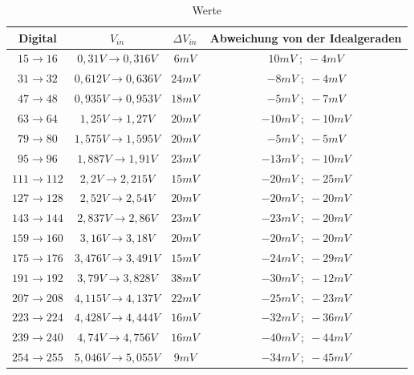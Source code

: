 \documentclass[12pt, a4paper, ngerman]{article}
\begin{document}
\begin{table}%
  \centering
  \begin{tabular}{|c|c|c|c|}
    \hline
    Digital              & $V_{in}$                   & $\Delta V_{in}$ & Abweichung von der Idealgeraden \\\hline
    $15\rightarrow 16$   & $0,31V\rightarrow 0,316V$  & $6mV$           & $10mV\;;\;-4mV$                 \\\hline
    $31\rightarrow 32$   & $0,612V\rightarrow 0,636V$ & $24mV$          & $-8mV\;;\; -4mV$                \\\hline
    $47\rightarrow 48$   & $0,935V\rightarrow 0,953V$ & $18mV$          & $-5mV\;;\; -7mV$                \\\hline
    $63\rightarrow 64$   & $1,25V\rightarrow 1,27 V$  & $20mV$          & $-10mV\;;\;-10mV$               \\\hline
    $79\rightarrow 80$   & $1,575V\rightarrow 1,595V$ & $20mV$          & $-5mV\;;\; -5mV$                \\\hline
    $95\rightarrow 96$   & $1,887V\rightarrow 1,91 V$ & $23mV$          & $-13mV\;;\;-10mV$               \\\hline
    $111\rightarrow 112$ & $2,2V\rightarrow 2,215V$   & $15mV$          & $-20mV\;;\;-25mV$               \\\hline
    $127\rightarrow 128$ & $2,52V\rightarrow 2,54 V$  & $20mV$          & $-20mV\;;\;-20mV$               \\\hline
    $143\rightarrow 144$ & $2,837V\rightarrow 2,86 V$ & $23mV$          & $-23mV\;;\;-20mV$               \\\hline
    $159\rightarrow 160$ & $3,16V\rightarrow 3,18 V$  & $20mV$          & $-20mV\;;\;-20mV$               \\\hline
    $175\rightarrow 176$ & $3,476V\rightarrow 3,491V$ & $15mV$          & $-24mV\;;\;-29mV$               \\\hline
    $191\rightarrow 192$ & $3,79V\rightarrow 3,828V$  & $38mV$          & $-30mV\;;\;-12mV$               \\\hline
    $207\rightarrow 208$ & $4,115V\rightarrow 4,137V$ & $22mV$          & $-25mV\;;\;-23mV$               \\\hline
    $223\rightarrow 224$ & $4,428V\rightarrow 4,444V$ & $16mV$          & $-32mV\;;\;-36mV$               \\\hline
    $239\rightarrow 240$ & $4,74V\rightarrow 4,756V$  & $16mV$          & $-40mV\;;\;-44mV$               \\\hline
    $254\rightarrow 255$ & $5,046V\rightarrow 5,055V$ & $9mV$           & $-34mV\;;\;-45mV$               \\\hline
  \end{tabular}
  \caption{Werte}
  \label{table:1}
\end{table}
\end{document}
